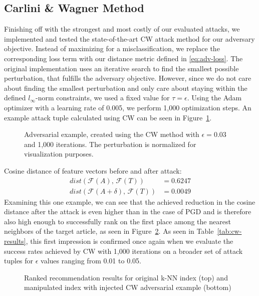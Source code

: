 \subsection{Carlini \& Wagner Method}
Finishing off with the strongest and most costly of our evaluated attacks, we implemented and tested the state-of-the-art \ac{CW} attack method for our adversary objective. Instead of maximizing for a misclassification, we replace the corresponding loss term with our distance metric defined in \ref{eq:adv-loss}. The original implementation uses an iterative search to find the smallest possible perturbation, that fulfills the adversary objective. However, since we do not care about finding the smallest perturbation and only care about staying within the defined $l_\infty$-norm constraints, we used a fixed value for $\tau=\epsilon$. Using the Adam optimizer with a learning rate of 0.005, we perform 1,000 optimization steps. An example attack tuple calculated using \ac{CW} can be seen in Figure~\ref{fig:cw-example}.
\begin{figure}[H]
	\centering
	
	\caption{Adversarial example, created using the \acs{CW} method with $\epsilon = 0.03$ and 1,000 iterations. The perturbation is normalized for visualization purposes.}
	\label{fig:cw-example}
\end{figure}
Cosine distance of feature vectors before and after attack:
\begin{align}
dist(\mathcal{F}(A),\,\mathcal{F}(T)) &= 0.6247 \\
dist(\mathcal{F}(A + \delta),\,\mathcal{F}(T)) &= 0.0049
\end{align}
Examining this one example, we can see that the achieved reduction in the cosine distance after the attack is even higher than in the case of \ac{PGD} and is therefore also high enough to successfully rank on the first place among the nearest neighbors of the target article, as seen in Figure~\ref{fig:cw-reco}. As seen in Table~\ref{tab:cw-results}, this first impression is confirmed once again when we evaluate the success rates achieved by \ac{CW} with 1,000 iterations on a broader set of attack tuples for $\epsilon$ values ranging from 0.01 to 0.05.
\begin{figure}[H]
	\centering
	
	\caption{Ranked recommendation results for original \acs{k-NN} index (top) and manipulated index with injected \acs{CW} adversarial example (bottom)}
	\label{fig:cw-reco}
\end{figure}

